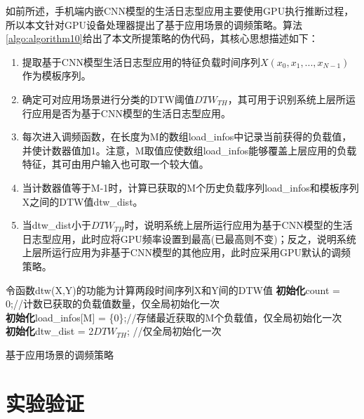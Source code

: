 如前所述，手机端内嵌CNN模型的生活日志型应用主要使用GPU执行推断过程，所以本文针对GPU设备处理器提出了基于应用场景的调频策略。算法\ref{algo:algorithm10}给出了本文所提策略的伪代码，其核心思想描述如下：
\begin{enumerate}
  \item 提取基于CNN模型生活日志型应用的特征负载时间序列$X(x_0, x_1, ... , x_ {N-1})$作为模板序列。
  \item 确定可对应用场景进行分类的DTW阈值$DTW_{TH}$，其可用于识别系统上层所运行应用是否为基于CNN模型的生活日志型应用。
  \item 每次进入调频函数，在长度为M的数组load\_infos中记录当前获得的负载值，并使计数器值加1。注意，M取值应使数组load\_infos能够覆盖上层应用的负载特征，其可由用户输入也可取一个较大值。
  \item 当计数器值等于M-1时，计算已获取的M个历史负载序列load\_infos和模板序列X之间的DTW值dtw\_dist。
  \item 当dtw\_dist小于$DTW_{TH}$时，说明系统上层所运行应用为基于CNN模型的生活日志型应用，此时应将GPU频率设置到最高(已最高则不变)；反之，说明系统上层所运行应用为非基于CNN模型的其他应用，此时应采用GPU默认的调频策略。
\end{enumerate}

\begin{algorithm}[htbp]
  \small
  \SetAlgoLined
    令函数dtw(X,Y)的功能为计算两段时间序列X和Y间的DTW值\;
    \textbf{初始化}count = 0;//计数已获取的负载值数量，仅全局初始化一次 \\
    \textbf{初始化}load\_infos[M] = \{0\};//存储最近获取的M个负载值，仅全局初始化一次 \\
    \textbf{初始化}dtw\_dist = 2$DTW_{TH}$; //仅全局初始化一次 \\

  \caption{基于应用场景的调频策略}
  \label{algo:algorithm10}
\end{algorithm}

\section{实验验证}


